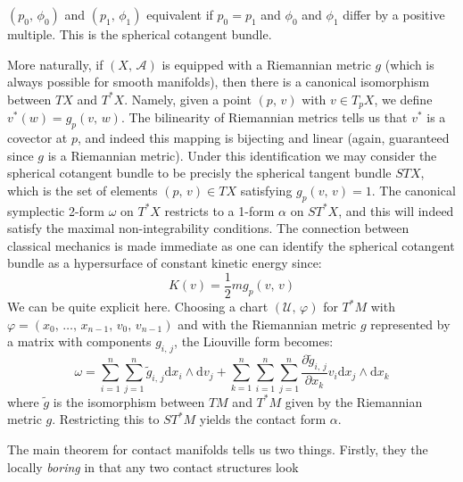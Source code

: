     $(p_{0},\,\phi_{0})$ and $(p_{1},\,\phi_{1})$ equivalent if $p_{0}=p_{1}$
    and $\phi_{0}$ and $\phi_{1}$ differ by a positive multiple. This is
    the spherical cotangent bundle.
    \par\hfill\par
    More naturally, if $(X,\,\mathcal{A})$ is equipped with a Riemannian metric
    $g$ (which is always possible for smooth manifolds), then there is a
    canonical isomorphism between $TX$ and $T^{*}X$. Namely, given a point
    $(p,\,v)$ with $v\in{T}_{p}X$, we define
    $v^{*}(w)=g_{p}(v,\,w)$. The bilinearity of Riemannian metrics tells us
    that $v^{*}$ is a covector at $p$, and indeed this mapping is bijecting
    and linear (again, guaranteed since $g$ is a Riemannian metric). Under this
    identification we may consider the spherical cotangent bundle to be
    precisly the spherical tangent bundle $STX$, which is the set of elements
    $(p,\,v)\in{TX}$ satisfying $g_{p}(v,\,v)=1$. The canonical symplectic
    2-form $\omega$ on $T^{*}X$ restricts to a 1-form $\alpha$ on
    $ST^{*}X$, and this will indeed satisfy the maximal non-integrability
    conditions. The connection between classical mechanics is made immediate
    as one can identify the spherical cotangent bundle as a hypersurface of
    constant kinetic energy since:
    \begin{equation}
        K(v)=\frac{1}{2}mg_{p}(v,\,v)
    \end{equation}
    We can be quite explicit here. Choosing a chart
    $(\mathcal{U},\,\varphi)$ for $T^{*}M$ with
    $\varphi=(x_{0},\,\dots,\,x_{n-1},\,v_{0},\,v_{n-1})$ and with the
    Riemannian metric $g$ represented by a matrix with components
    $g_{i,\,j}$, the Liouville form becomes:
    \begin{equation}
        \omega=\sum_{i=1}^{n}\sum_{j=1}^{n}
            \tilde{g}_{i,\,j}\textrm{d}x_{i}\land\textrm{d}v_{j}+
        \sum_{k=1}^{n}\sum_{i=1}^{n}\sum_{j=1}^{n}
            \frac{\partial\tilde{g}_{i,\,j}}{\partial{x}_{k}}
            v_{i}\textrm{d}x_{j}\land\textrm{d}x_{k}
    \end{equation}
    where $\tilde{g}$ is the isomorphism between $TM$ and $T^{*}M$ given by
    the Riemannian metric $g$.
    Restricting this to $ST^{*}M$ yields the contact form $\alpha$.
    \par\hfill\par
    The main theorem for contact manifolds tells us two things. Firstly,
    they the locally \textit{boring} in that any two contact structures look
